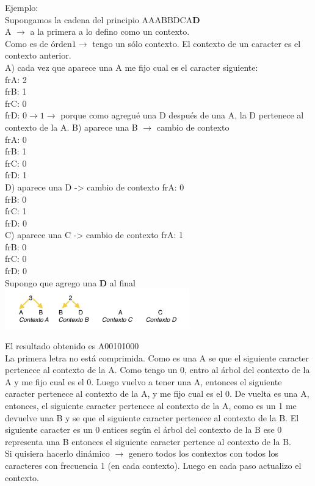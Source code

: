 \documentclass[titlepage,a4paper]{article}
\begin{document}
Ejemplo: \\

Supongamos la cadena del principio AAABBDCA\textbf{D}\\
A $\rightarrow$ a la primera a lo defino como un contexto.\\
Como es de órden$ 1 \rightarrow$  tengo un sólo contexto. El contexto de un caracter es el contexto anterior.\\
A) cada vez que aparece una A me fijo cual es el caracter siguiente: \\
frA: 2\\
frB: 1\\
frC: 0\\
frD: $0\rightarrow1 \rightarrow$ porque como agregué una D después de una A, la D pertenece al contexto de la A. 
B) aparece una B $\rightarrow$ cambio de contexto\\
frA: 0\\
frB: 1\\
frC: 0\\
frD: 1\\
D) aparece una D -> cambio de contexto frA: 0\\
frB: 0\\
frC: 1\\
frD: 0\\
C) aparece una C -> cambio de contexto frA: 1\\
frB: 0\\
frC: 0\\
frD: 0\\
Supongo que agrego una\textbf{ D }al final\\

\includegraphics[width=8cm]{resumen-parcial-marijuan-ejemploOrdenSuperior}

El resultado obtenido es A00101000\\
La primera letra no está comprimida. Como es una A se que el siguiente caracter pertenece al contexto de la A. Como tengo un 0, entro al árbol del contexto de la A y me fijo cual es el 0. Luego vuelvo a tener una A, entonces el siguiente caracter pertenece al contexto de la A, y me fijo cual es el 0. De vuelta es una A, entonces, el siguiente caracter pertenece al contexto de la A, como es un 1 me devuelve una B y se que el siguiente caracter pertenece al contexto de la B. El siguiente caracter es un 0 entices según el árbol del contexto de la B ese 0 representa una B entonces el siguiente caracter pertence al contexto de la B.\\
Si quisiera hacerlo dinámico $\rightarrow$ genero todos los contextos con todos los caracteres con frecuencia 1 (en cada contexto). Luego en cada paso actualizo el contexto.\\
\end{document}
